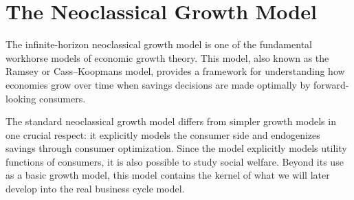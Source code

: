 \documentclass[\topdir/lecture\_notes.tex]{subfiles}
\begin{document}

\section{The Neoclassical Growth Model}
The infinite-horizon neoclassical growth model is one of the fundamental workhorse models of economic growth theory.
This model, also known as the Ramsey or Cass--Koopmans model, provides a framework for understanding how economies grow over time when savings decisions are made optimally by forward-looking consumers.

The standard neoclassical growth model differs from simpler growth models in one crucial respect: it explicitly models the consumer side and endogenizes savings through consumer optimization.
Since the model explicitly models utility functions of consumers, it is also possible to study social welfare.
Beyond its use as a basic growth model, this model contains the kernel of what we will later develop into the real business cycle model.
\end{document}
